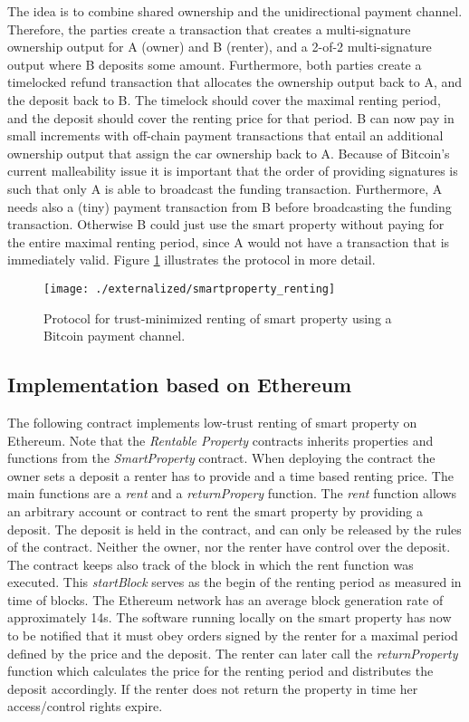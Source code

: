 The idea is to combine shared ownership and the unidirectional payment channel. Therefore, the parties create a transaction that creates a multi-signature ownership output for A (owner) and B (renter), and a 2-of-2 multi-signature output where B deposits some amount. Furthermore, both parties create a timelocked refund transaction that allocates the ownership output back to A, and the deposit back to B. The timelock should cover the maximal renting period, and the deposit should cover the renting price for that period. B can now pay in small increments with off-chain payment transactions that entail an additional ownership output that assign the car ownership back to A. Because of Bitcoin's current malleability issue it is important that the order of providing signatures is such that only A is able to broadcast the funding transaction. Furthermore, A needs also a (tiny) payment transaction from B before broadcasting the funding transaction. Otherwise B could just use the smart property without paying for the entire maximal renting period, since A would not have a transaction that is immediately valid. Figure \ref{fig:smartproperty_renting} illustrates the protocol in more detail.

\begin{figure}[!t]
    \centering
    \texttt{[image: ./externalized/smartproperty\_renting]}
    \caption{Protocol for trust-minimized renting of smart property using a Bitcoin payment channel.}
    \label{fig:smartproperty_renting}
  \end{figure}

\subsection{Implementation based on Ethereum}


The following contract implements low-trust renting of smart property on Ethereum. Note that the \emph{Rentable Property} contracts inherits properties and functions from the \emph{SmartProperty} contract. When deploying the contract the owner sets a deposit a renter has to provide and a time based renting price. The main functions are a \emph{rent} and a \emph{returnPropery} function. The \emph{rent} function allows an arbitrary account or contract to rent the smart property by providing a deposit. The deposit is held in the contract, and can only be released by the rules of the contract. Neither the owner, nor the renter have control over the deposit. The contract keeps also track of the block in which the rent function was executed. This \emph{startBlock} serves as the begin of the renting period as measured in time of blocks. The Ethereum network has an average block generation rate of approximately 14s. 
The software running locally on the smart property has now to be notified that it must obey orders signed by the renter for a maximal period defined by the price and the deposit. 
The renter can later call the \emph{returnProperty} function which calculates the price for the renting period and distributes the deposit accordingly. If the renter does not return the property in time her access/control rights expire. 

